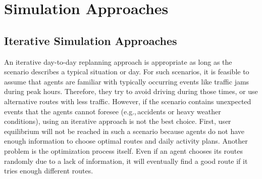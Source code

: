 \section{Simulation Approaches} 
\label{sec:SimulationApproaches}
\subsection{Iterative Simulation Approaches} 
\label{sec:IterativeSimulationApproaches}

An iterative day-to-day replanning approach is appropriate as long as the scenario describes a typical situation or day. For such scenarios, it is feasible to assume that agents are familiar with typically occurring events like traffic jams during peak hours. Therefore, they try to avoid driving during those times, or use alternative routes with less traffic. However, if the scenario contains unexpected events that the agents cannot foresee (e.g.,\,accidents or heavy weather conditions), using an iterative approach is not the best choice. First, user equilibrium will not be reached in such a scenario because agents do not have enough information to choose optimal routes and daily activity plans. Another problem is the optimization process itself. Even if an agent chooses its routes randomly due to a lack of information, it will eventually find a good route if it tries enough different routes.


